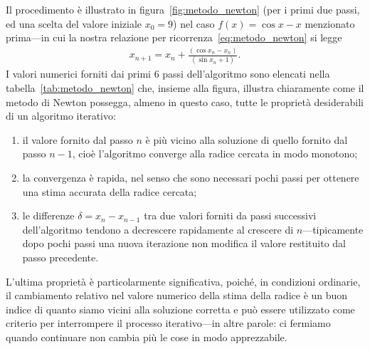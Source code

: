 Il procedimento è illustrato in figura~\ref{fig:metodo_newton} (per i primi
due passi, ed una scelta del valore iniziale $x_0 = 9$) nel caso
$f(x) = \cos x - x$ menzionato prima---in cui la nostra relazione per
ricorrenza~\eqref{eq:metodo_newton} si legge
\begin{align*}
  x_{n+1} = x_n + \frac{(\cos x_n - x_n)}{(\sin x_n + 1)}.
\end{align*}
I valori numerici forniti dai primi $6$ passi dell'algoritmo sono elencati
nella tabella~\ref{tab:metodo_newton} che, insieme alla figura, illustra
chiaramente come il metodo di Newton possegga, almeno in questo caso, tutte le
proprietà desiderabili di un algoritmo iterativo:
\begin{enumerate}
\item il valore fornito dal passo $n$ è più vicino alla soluzione
  di quello fornito dal passo $n - 1$, cioè l'algoritmo converge alla
  radice cercata in modo monotono;
\item la convergenza è rapida, nel senso che sono necessari pochi passi
  per ottenere una stima accurata della radice cercata;
\item le differenze $\delta = x_n - x_{n-1}$ tra due valori forniti da passi
  successivi dell'algoritmo tendono a decrescere rapidamente al crescere di
  $n$---tipicamente dopo pochi passi una nuova iterazione non modifica
  il valore restituito dal passo precedente.
\end{enumerate}
L'ultima proprietà è particolarmente significativa, poiché, in condizioni
ordinarie, il cambiamento relativo nel valore numerico della stima della radice
è un buon indice di quanto siamo vicini alla soluzione corretta e può essere
utilizzato come criterio per interrompere il processo iterativo---in altre
parole: ci fermiamo quando continuare non cambia più le cose in modo
apprezzabile.

\begin{table}[htbp]
\end{table}


